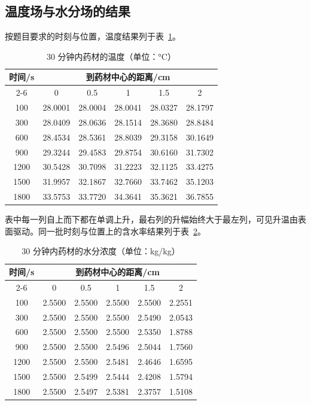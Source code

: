 \subsection{温度场与水分场的结果}

按题目要求的时刻与位置，温度结果列于表~\ref{tab:q1T}。

\begin{table}[H]
\centering
\caption{30 分钟内药材的温度（单位：°C）}\label{tab:q1T}
\begin{tabular}{cccccc}
\toprule
\multirow{2}{*}{时间/s} & \multicolumn{5}{c}{到药材中心的距离/cm}\\
\cmidrule(lr){2-6}
 & 0 & 0.5 & 1 & 1.5 & 2 \\
\midrule
100  & 28.0001 & 28.0004 & 28.0041 & 28.0327 & 28.1797 \\
300  & 28.0409 & 28.0636 & 28.1514 & 28.3680 & 28.8484 \\
600  & 28.4534 & 28.5361 & 28.8039 & 29.3158 & 30.1649 \\
900  & 29.3244 & 29.4583 & 29.8754 & 30.6160 & 31.7302 \\
1200 & 30.5428 & 30.7098 & 31.2223 & 32.1125 & 33.4275 \\
1500 & 31.9957 & 32.1867 & 32.7660 & 33.7462 & 35.1203 \\
1800 & 33.5753 & 33.7720 & 34.3641 & 35.3621 & 36.7855 \\
\bottomrule
\end{tabular}
\end{table}

表中每一列自上而下都在单调上升，最右列的升幅始终大于最左列，可见升温由表面驱动。同一批时刻与位置上的含水率结果列于表~\ref{tab:q1C}。

\begin{table}[H]
\centering
\caption{30 分钟内药材的水分浓度（单位：kg/kg）}\label{tab:q1C}
\begin{tabular}{cccccc}
\toprule
\multirow{2}{*}{时间/s} & \multicolumn{5}{c}{到药材中心的距离/cm}\\
\cmidrule(lr){2-6}
 & 0 & 0.5 & 1 & 1.5 & 2 \\
\midrule
100  & 2.5500 & 2.5500 & 2.5500 & 2.5500 & 2.2551 \\
300  & 2.5500 & 2.5500 & 2.5500 & 2.5490 & 2.0543 \\
600  & 2.5500 & 2.5500 & 2.5500 & 2.5350 & 1.8788 \\
900  & 2.5500 & 2.5500 & 2.5496 & 2.5044 & 1.7560 \\
1200 & 2.5500 & 2.5500 & 2.5481 & 2.4646 & 1.6595 \\
1500 & 2.5500 & 2.5499 & 2.5444 & 2.4208 & 1.5794 \\
1800 & 2.5500 & 2.5497 & 2.5381 & 2.3757 & 1.5108 \\
\bottomrule
\end{tabular}
\end{table}

